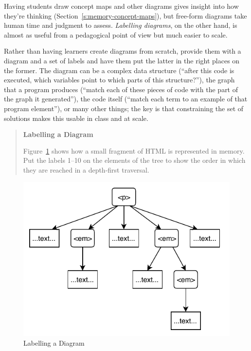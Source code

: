 Having students draw concept maps and other diagrams gives insight into
how they're thinking (Section~\ref{s:memory-concept-maps}), but free-form
diagrams take human time and judgment to assess. \emph{Labelling diagrams},
on the other hand, is almost as useful from a pedagogical point of view
but much easier to scale.

Rather than having learners create diagrams from scratch, provide them
with a diagram and a set of labels and have them put the latter in the
right places on the former. The diagram can be a complex data structure
(``after this code is executed, which variables point to which parts of
this structure?''), the graph that a program produces (``match each of
these pieces of code with the part of the graph it generated''), the code
itself (``match each term to an example of that program element''), or
many other things; the key is that constraining the set of solutions
makes this usable in class and at scale.

\begin{quote}\setlength{\parindent}{0pt}
\textbf{Labelling a Diagram}

Figure~\ref{f:exercises-labelling} shows how a small fragment of HTML is represented in
memory. Put the labels 1--10 on the elements of the tree to show the
order in which they are reached in a depth-first traversal.
\end{quote}

\begin{figure}
\centering
\includegraphics{../../figures/labelling.pdf}
\caption{Labelling a Diagram}
\label{f:exercises-labelling}
\end{figure}

